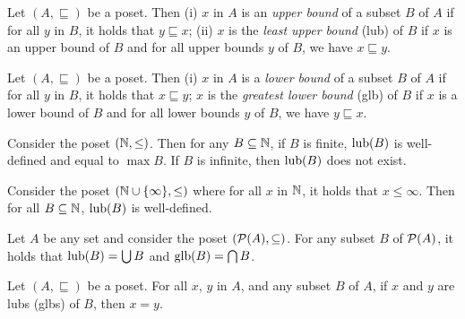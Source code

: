 \begin{definition}
    Let $(A,\sqsubseteq)$ be a poset. Then (i) $x$ in $A$ is an \emph{upper bound} of a subset $B$ of $A$ if for all $y$ in $B$, it holds that $y \sqsubseteq x$;
    (ii) $x$ is the \emph{least upper bound} (lub) of $B$ if $x$ is an upper bound of $B$ and for all upper bounds $y$ of $B$, we have $x \sqsubseteq y$. %
\end{definition}

\begin{definition}
    Let $(A,\sqsubseteq)$ be a poset. Then (i) $x$ in $A$ is a \emph{lower bound} of a subset $B$ of $A$ if for all $y$ in $B$, it holds that $x \sqsubseteq y$; $x$ is the \emph{greatest lower bound} (glb) of $B$ if $x$ is a lower bound of $B$ and for all lower bounds $y$ of $B$, we have $y \sqsubseteq x$. %
\end{definition}

\begin{example}
    Consider the poset $(\mathbb{N},\leq)$. Then for any $B \subseteq \mathbb{N}$, if $B$ is finite, $\operatorname{lub}(B)$ is well-defined and equal to $\max B$. If $B$ is infinite, then $\operatorname{lub}(B)$ does not exist.
\end{example}

\begin{example}
   Consider the poset $(\mathbb{N} \cup \{\infty\},\leq)$ where for all $x$ in $\mathbb{N}$, it holds that $x \leq \infty$. Then for all $B \subseteq \mathbb{N}$, $\operatorname{lub}(B)$ is well-defined.
\end{example}

\begin{example}
    Let $A$ be any set and consider the poset $(\mathcal{P}(A),\subseteq)$. For any subset $B$ of $\mathcal{P}(A)$, it holds that $\operatorname{lub}(B) = \bigcup B$ and $\operatorname{glb}(B) = \bigcap B$.
\end{example}

\begin{lemma}
  Let $(A,\sqsubseteq)$ be a poset. For all $x$, $y$ in $A$, and any subset $B$ of $A$, if $x$ and $y$ are lubs (glbs) of $B$, then $x = y$.
\end{lemma}

